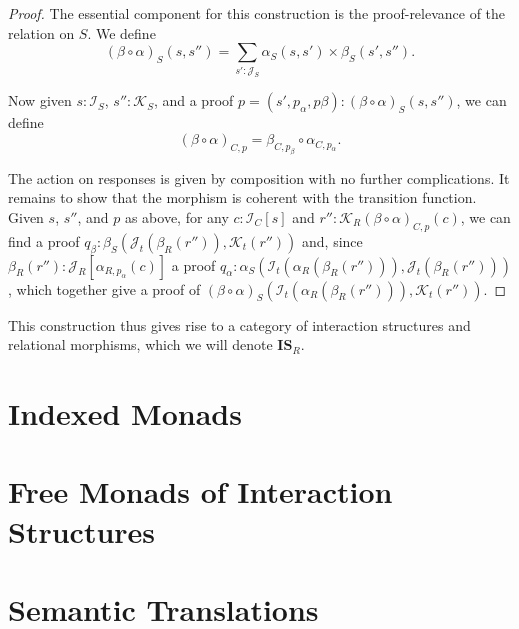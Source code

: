 \documentclass{article}
\theoremstyle{definition}
\newcommand{\iss}[1]{\mathcal{#1}_S}
\newcommand{\isc}[1]{\mathcal{#1}_C}
\newcommand{\isr}[1]{\mathcal{#1}_R}
\newcommand{\ist}[1]{\mathcal{#1}_t}
\begin{document}
    \begin{proof}
        The essential component for this construction is the proof-relevance of the relation on $S$.  We define
        \[
            (\beta \circ \alpha)_S(s, s'') = \sum_{s' : \iss J} \alpha_S(s, s') \times \beta_S(s', s'').
        \]

        Now given $s : \iss I$, $s'' : \iss K$, and a proof $p = (s', p_\alpha, p\beta) : (\beta \circ \alpha)_S(s, s'')$,
        we can define
        \[
            (\beta \circ \alpha)_{C, p} = \beta_{C, p_\beta} \circ \alpha_{C, p_\alpha}.
        \]

        The action on responses is given by composition with no further complications.  It remains to show that the
        morphism is coherent with the transition function.  Given $s$, $s''$, and $p$ as above, for any $c : \isc I[s]$
        and $r'' : \isr K{(\beta \circ \alpha)_{C, p}(c)}$, we can find a proof $q_\beta : \beta_S(\ist J(\beta_R(r'')),
        \ist K(r''))$ and, since $\beta_R(r'') : \isr J[\alpha_{R, p_\alpha}(c)]$ a proof $q_\alpha :
        \alpha_S(\ist I(\alpha_R(\beta_R(r''))), \ist J(\beta_R(r'')))$, which together give a proof of $(\beta \circ
        \alpha)_S(\ist I(\alpha_R(\beta_R(r''))), \ist K(r''))$.
    \end{proof}

    This construction thus gives rise to a category of interaction structures and relational morphisms, which we will
    denote $\mathbf{IS}_R$.



    \section{Indexed Monads}

    \section{Free Monads of Interaction Structures}

    \section{Semantic Translations}
\end{document}
